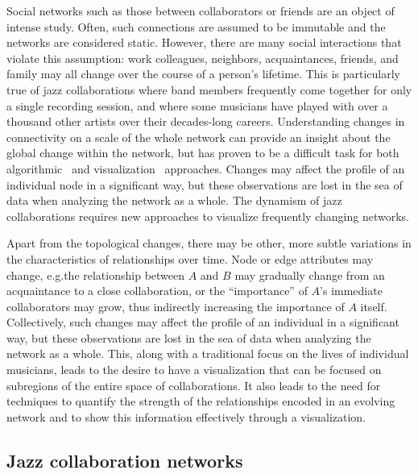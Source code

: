 \documentclass[12pt]{cmuthesis}
\begin{document}
  Social networks such as those between collaborators or friends are an object of intense study. Often, such connections are assumed to be immutable and the networks are considered static. However, there are many social interactions that violate this assumption: work colleagues, neighbors, acquaintances, friends, and family may all change over the course of a person's lifetime. This is particularly true of jazz collaborations where band members frequently come together for only a single recording session, and where some musicians have played with over a thousand other artists over their decades-long careers. Understanding changes in connectivity on a scale of the whole network can provide an insight about the global change within the network, but has proven to be a difficult task for both algorithmic~\cite{Hopcroft2004, Palla2005c, Tantipathananandh2007, TangLiuZhna08} and visualization~\cite{BenderDeMoll2006, Rosvall2010,Yi2010} approaches. Changes may affect the profile of an individual node in a significant way, but these observations are lost in the sea of data when analyzing the network as a whole. The dynamism of jazz collaborations requires new approaches to visualize frequently changing networks.

  Apart from the topological changes, there may be other, more subtle variations in the characteristics of relationships over time.  Node or edge attributes may change, e.g.\@ the relationship between $A$ and $B$ may gradually change from an acquaintance to a close collaboration, or the ``importance'' of $A$'s immediate collaborators may grow, thus indirectly increasing the importance of $A$ itself.  Collectively, such changes may affect the profile of an individual in a significant way, but these observations are lost in the sea of data when analyzing the network as a whole. This, along with a traditional focus on the lives of individual musicians, leads to the desire to have a visualization that can be focused on subregions of the entire space of collaborations. It also leads to the need for techniques to quantify the strength of the relationships encoded in an evolving network and to show this information effectively through a visualization.

  \subsection{Jazz collaboration networks}
\end{document}
